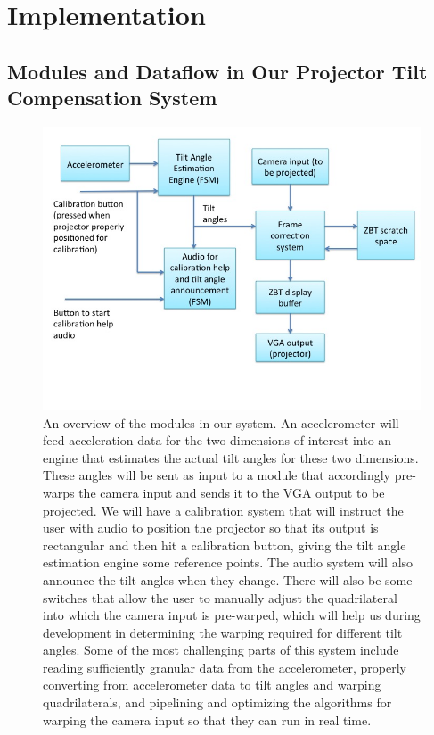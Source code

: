 \documentclass{article}
\begin{document}
\section{Implementation}

\subsection{Modules and Dataflow in Our Projector Tilt Compensation System}
\begin{figure}
\centering
\includegraphics[width=\textwidth]{img/block_diag}
\caption{An overview of the modules in our system. An accelerometer will feed acceleration data for the two dimensions of interest into an engine that estimates the actual tilt angles for these two dimensions. These angles will be sent as input to a module that accordingly pre-warps the camera input and sends it to the VGA output to be projected. We will have a calibration system that will instruct the user with audio to position the projector so that its output is rectangular and then hit a calibration button, giving the tilt angle estimation engine some reference points. The audio system will also announce the tilt angles when they change. There will also be some switches that allow the user to manually adjust the quadrilateral into which the camera input is pre-warped, which will help us during development in determining the warping required for different tilt angles. Some of the most challenging parts of this system include reading sufficiently granular data from the accelerometer, properly converting from accelerometer data to tilt angles and warping quadrilaterals, and pipelining and optimizing the algorithms for warping the camera input so that they can run in real time.}
\end{figure}
\end{document}
